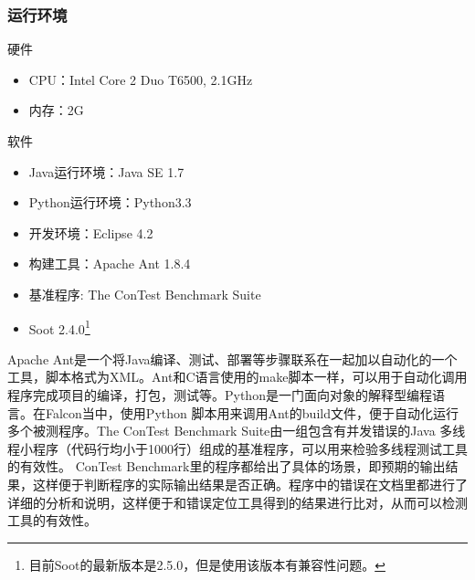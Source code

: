 \subsubsection{运行环境}
\noindent 硬件
\begin{itemize}
  \item CPU：Intel Core 2 Duo T6500, 2.1GHz
  \item 内存：2G
\end{itemize}
软件
\begin{itemize}
  \item Java运行环境：Java SE 1.7
  \item Python运行环境：Python3.3
  \item 开发环境：Eclipse 4.2
  \item 构建工具：Apache Ant 1.8.4
  \item 基准程序: The ConTest Benchmark Suite
  \item Soot 2.4.0\footnote{目前Soot的最新版本是2.5.0，但是使用该版本有兼容性问题。}
\end{itemize}\par
Apache Ant是一个将Java编译、测试、部署等步骤联系在一起加以自动化的一个工具，脚本格式为XML。Ant和C语言使用的make脚本一样，可以用于自动化调用程序完成项目的编译，打包，测试等。Python是一门面向对象的解释型编程语言。在Falcon当中，使用Python 脚本用来调用Ant的build文件，便于自动化运行多个被测程序。The ConTest Benchmark Suite由一组包含有并发错误的Java 多线程小程序（代码行均小于1000行）组成的基准程序，可以用来检验多线程测试工具的有效性\cite{eytani2007towards}。 ConTest Benchmark里的程序都给出了具体的场景，即预期的输出结果，这样便于判断程序的实际输出结果是否正确。程序中的错误在文档里都进行了详细的分析和说明，这样便于和错误定位工具得到的结果进行比对，从而可以检测工具的有效性。

